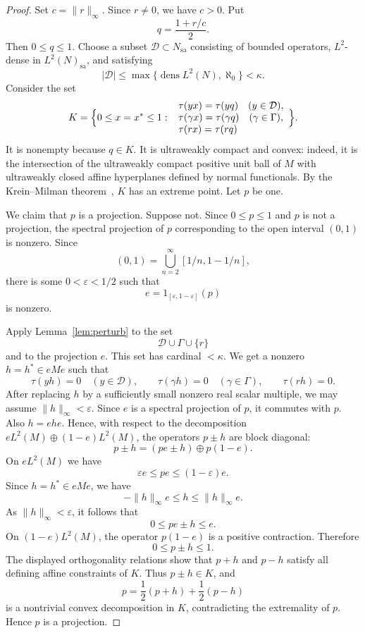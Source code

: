 \documentclass[11pt,letterpaper,reqno]{amsart}
\theoremstyle{definition}
\numberwithin{equation}{section}
\newcommand{\sa}{\mathrm{sa}}
\newcommand{\one}{1}
\DeclareMathOperator{\dens}{dens}
\begin{document}
\begin{proof}
Set $c=\|r\|_\infty$. Since $r\neq0$, we have $c>0$.  Put
\[
   q=\frac{\one+r/c}{2}.
\]
Then $0\leq q\leq\one$.  Choose a subset $\mathcal D\subset N_{\sa}$ consisting of bounded operators, $L^2$-dense in $L^2(N)_{\sa}$, and satisfying
\[
   |\mathcal D|\leq\max\{\dens L^2(N),\aleph_0\}<\kappa.
\]
Consider the set
\[
K=\Bigl\{0\leq x=x^*\leq\one:\
\begin{array}{l}
\tau(yx)=\tau(yq)\quad (y\in\mathcal D),\\
\tau(\gamma x)=\tau(\gamma q)\quad (\gamma\in\Gamma),\\
\tau(rx)=\tau(rq)
\end{array}
\Bigr\}.
\]
It is nonempty because $q\in K$.  It is ultraweakly compact and convex: indeed, it is the intersection of the ultraweakly compact positive unit ball of $M$ with ultraweakly closed affine hyperplanes defined by normal functionals.  By the Krein--Milman theorem~\cite{Con90}, $K$ has an extreme point.  Let $p$ be one.

We claim that $p$ is a projection.  Suppose not.  Since $0\leq p\leq1$ and
$p$ is not a projection, the spectral projection of $p$ corresponding to the
open interval $(0,1)$ is nonzero.  Since
\[
   (0,1)=\bigcup_{n=2}^\infty [1/n,1-1/n],
\]
there is some $0<\varepsilon<1/2$ such that
\[
   e=1_{[\varepsilon,1-\varepsilon]}(p)
\]
is nonzero.

Apply Lemma~\ref{lem:perturb} to the set
\[
   \mathcal D\cup\Gamma\cup\{r\}
\]
and to the projection $e$.  This set has cardinal $<\kappa$.  We get a
nonzero $h=h^*\in eMe$ such that
\[
   \tau(yh)=0\quad(y\in\mathcal D),\qquad
   \tau(\gamma h)=0\quad(\gamma\in\Gamma),\qquad
   \tau(rh)=0.
\]
After replacing $h$ by a sufficiently small nonzero real scalar multiple, we
may assume $\|h\|_\infty<\varepsilon$.  Since \(e\) is a spectral projection
of \(p\), it commutes with \(p\).  Also \(h=ehe\).  Hence, with respect to
the decomposition \(eL^2(M)\oplus(1-e)L^2(M)\), the operators \(p\pm h\)
are block diagonal:
\[
   p\pm h=(pe\pm h)\oplus p(1-e).
\]
On \(eL^2(M)\) we have
\[
   \varepsilon e\leq pe\leq(1-\varepsilon)e.
\]
Since \(h=h^*\in eMe\), we have
\[
   -\|h\|_\infty e\le h\le \|h\|_\infty e.
\]
As \(\|h\|_\infty<\varepsilon\), it follows that
\[
   0\leq pe\pm h\leq e.
\]
On \((1-e)L^2(M)\), the operator \(p(1-e)\) is a positive contraction.
Therefore
\[
   0\leq p\pm h\leq1.
\]
The displayed orthogonality relations show that $p+h$ and $p-h$ satisfy all
defining affine constraints of $K$.  Thus $p\pm h\in K$, and
\[
   p=\frac12(p+h)+\frac12(p-h)
\]
is a nontrivial convex decomposition in $K$, contradicting the extremality
of $p$.  Hence $p$ is a projection.


\end{proof}
\end{document}
